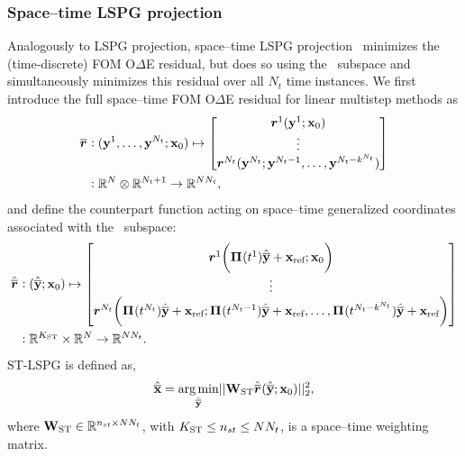 \documentclass[3p,computermodern,10pt]{elsarticle}
\begin{document}
\subsubsection{Space--time LSPG projection}  
Analogously to LSPG projection, space--time LSPG projection~\cite{choi_stlspg}
minimizes the (time-discrete) FOM O$\Delta$E residual, but does so
using the \spaceTimeAcronym\ subspace and simultaneously minimizes this
residual over all $N_t$ time instances.
We first introduce the full space--time FOM O$\Delta$E residual for linear
multistep methods as
\begin{align*}
\overline{\boldsymbol r}_{} & \vcentcolon (\mathbf{y}^{1}, \ldots
	,\mathbf{y}^{N_t};{{\mathbf{x}}_0}) \mapsto \begin{bmatrix}
\boldsymbol r_{}^{1}(\mathbf{y}^{1}; {{\mathbf{x}}_0}) 
\\ 
\vdots \\
\boldsymbol r_{}^{N_t}(\mathbf{y}^{N_t};\mathbf{y}^{N_t-1},\ldots,\mathbf{y}^{N_t - k^{N_t}}) \end{bmatrix}  \\
& \vcentcolon \mathbb{R}^{N} \otimes \mathbb{R}^{N_t+1} \rightarrow \mathbb{R}^{N N_t},
\end{align*}
and define the counterpart function acting on space--time generalized
coordinates associated with the \spaceTimeAcronym\ subspace:
\begin{align*}
\hat{\overline{\boldsymbol r}}_{\text{}} & \vcentcolon (\hat{\mathbf{\overline{y}}} ;{{\mathbf{x}}_0}) \mapsto \begin{bmatrix}
\boldsymbol r_{}^{1}\bigg( \boldsymbol \Pi^{}(t^1)\hat{\mathbf{\overline{y}}} + \mathbf{x}_\text{ref}; {{\mathbf{x}}_0} \bigg)
\\ 
\vdots \\
\boldsymbol r_{}^{N_t}\bigg( \boldsymbol \Pi^{}(t^{N_t})\hat{\mathbf{\overline{y}}} + \mathbf{x}_\text{ref}; \boldsymbol \Pi^{}(t^{N_t-1})\hat{\mathbf{\overline{y}}} + \mathbf{x}_\text{ref} ,\ldots,  \boldsymbol \Pi^{}(t^{N_t-k^{N_t}})\hat{\mathbf{\overline{y}}} + \mathbf{x}_\text{ref} \bigg)  \\ 
\end{bmatrix}  \\
& \vcentcolon \mathbb{R}^{K_{\text{ST}}} \times \mathbb{R}^{N} \rightarrow \mathbb{R}^{N N_t}. 
\end{align*}
ST-LSPG is defined as,
\begin{equation*}
\hat{\mathbf{\overline{x}}} = \underset{ \hat{\mathbf{\overline{y}}} }{\text{arg\,min}}|| \mathbf{W}_{\text{ST}}  \hat{\overline{\boldsymbol r}}_{\text{}}(\hat{\mathbf{\overline{y}}};{{\mathbf{x}}_0}) ||_2^2, 
\end{equation*}
where $\mathbf{W}_{\text{ST}} \in \mathbb{R}^{n_{st} \times N N_t}$, with $K_{\text{ST}} \le n_{st} \le N N_t$, is a space--time weighting matrix.
\end{document}
